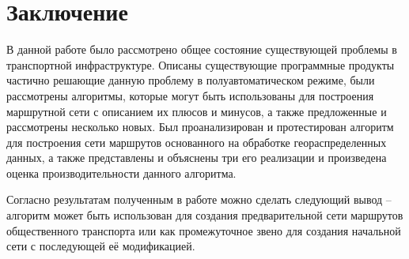 \part{Заключение}
В данной работе было рассмотрено общее состояние существующей проблемы в транспортной инфраструктуре. Описаны 
существующие программные продукты частично решающие данную проблему в полуавтоматическом режиме, были 
рассмотрены алгоритмы, которые могут быть использованы для построения маршрутной сети с описанием их плюсов и 
минусов, а также предложенные и рассмотрены несколько новых. Был проанализирован и протестирован алгоритм для 
построения сети маршрутов основанного на обработке геораспределенных данных, а также представлены и объяснены 
три его реализации и произведена оценка производительности данного алгоритма.

Согласно результатам полученным в работе можно сделать следующий вывод -- алгоритм может быть использован для 
создания предварительной сети маршрутов общественного транспорта или как промежуточное звено для создания 
начальной сети с последующей её модификацией.